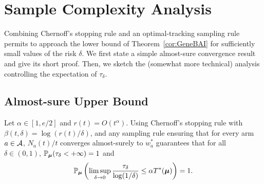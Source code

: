 \documentclass{colt2016} %
\begin{document}
\section{Sample Complexity Analysis}\label{sec:SCAnalysis}
Combining Chernoff's stopping rule and an optimal-tracking sampling rule permits to approach the lower bound of Theorem~\ref{cor:GeneBAI} for sufficiently small values of the risk $\delta$. 
We first state a simple almost-sure convergence result and give its short proof. 
Then, we sketch the (somewhat more technical) analysis controlling  the expectation of $\tau_\delta$.
\subsection{Almost-sure Upper Bound}
\begin{proposition}\label{lem:AnalysisAS} Let $\alpha\in [1,e/2]$ and $r(t) = O(t^\alpha)$. Using Chernoff's stopping rule with $\beta(t,\delta)=\log(r(t)/\delta)$, and any sampling rule ensuring that for every arm $a\in\mathcal{A}$, $N_a(t)/t$ converges almost-surely to $w_a^*$ guarantees that for all $\delta\in (0,1)$, $\mathbb{P}_{\bm\mu}(\tau_\delta < +\infty)=1$ and  \[\mathbb{P}_{\bm\mu}\left(\limsup_{\delta \rightarrow 0}\frac{\tau_\delta}{\log(1/\delta)} \leq \alpha T^*(\bm \mu) \right) = 1.\]
 \end{proposition}
\end{document}
